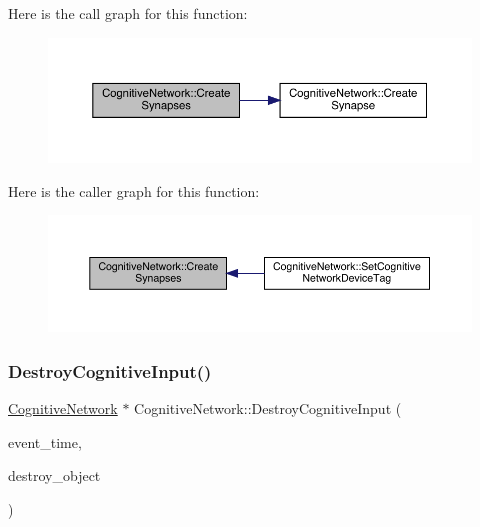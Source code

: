 Here is the call graph for this function\+:
\nopagebreak
\begin{figure}[H]
\begin{center}
\leavevmode
\includegraphics[width=350pt]{class_cognitive_network_ae6ae16f401e7699032ac9459132763c0_cgraph}
\end{center}
\end{figure}
Here is the caller graph for this function\+:
\nopagebreak
\begin{figure}[H]
\begin{center}
\leavevmode
\includegraphics[width=350pt]{class_cognitive_network_ae6ae16f401e7699032ac9459132763c0_icgraph}
\end{center}
\end{figure}
\mbox{\label{class_cognitive_network_a12e085cd47b7661190527fe55b6da8dc}} 
\subsubsection{\texorpdfstring{Destroy\+Cognitive\+Input()}{DestroyCognitiveInput()}}
{\footnotesize\ttfamily \hyperlink{class_cognitive_network}{Cognitive\+Network} $\ast$ Cognitive\+Network\+::\+Destroy\+Cognitive\+Input (\begin{DoxyParamCaption}\item[{std\+::chrono\+::time\+\_\+point$<$ \hyperlink{universe_8h_a0ef8d951d1ca5ab3cfaf7ab4c7a6fd80}{Clock} $>$}]{event\+\_\+time,  }\item[{\hyperlink{class_cognitive_network}{Cognitive\+Network} $\ast$}]{destroy\+\_\+object }\end{DoxyParamCaption})}



